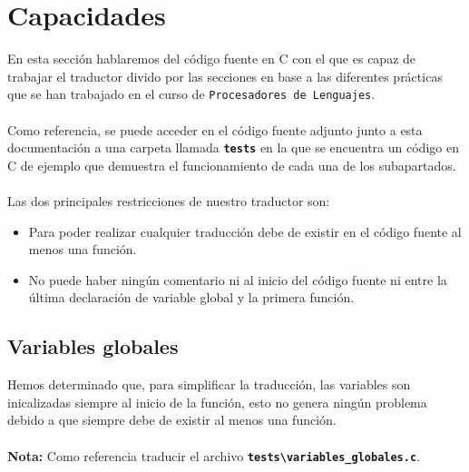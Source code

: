 \documentclass[]{article}
\begin{document}
        \section{Capacidades}
        En esta sección hablaremos del código fuente en C con el que es capaz de trabajar el traductor divido por las secciones en base a las diferentes prácticas que se han trabajado en el curso de \texttt{Procesadores de Lenguajes}. \\\\ Como referencia, se puede acceder en el código fuente adjunto junto a esta documentación a una carpeta llamada \texttt{\textbf{tests}} en la que se encuentra un código en C de ejemplo que demuestra el funcionamiento de cada una de los subapartados. \\\\ Las dos principales restricciones de nuestro traductor son: \\ \begin{itemize}
        \item Para poder realizar cualquier traducción debe de existir en el código fuente al menos una función.
        \item No puede haber ningún comentario ni al inicio del código fuente ni entre la última declaración de variable global y la primera función. \\
        \end{itemize}

        \subsection{Variables globales}
        Hemos determinado que, para simplificar la traducción, las variables son inicalizadas siempre al inicio de la función, esto no genera ningún problema debido a que siempre debe de existir al menos una función. \\\\ \textbf{Nota:} Como referencia traducir el archivo \texttt{\textbf{tests\textbackslash variables\_{globales.c}}}.
        
\end{document}

